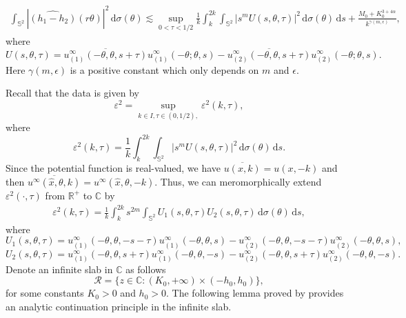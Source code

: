 \documentclass[reqno, 12pt]{amsart}
\numberwithin{equation}{section}
\begin{document}
	\begin{align} \label{5.9}
		\int_{\mathbb S^2}|\widehat{(h_1-h_2)}(r\theta)|^2\,\mathrm{d}\sigma(\theta)\lesssim \sup_{0<\tau<1/2}\frac{1}{k}\int_k^{2k}\int_{\mathbb S^2}|s^mU(s,\theta,\tau)|^2\,\mathrm{d}\sigma(\theta)\,\mathrm{d}s
		+ \frac{M_0+K_0^{3+4\alpha}}{k^{\gamma(m,\epsilon)}},
	\end{align} where
	\[U(s,\theta,\tau)=\overline{u_{(1)}^\infty(-\theta, \theta,s+\tau)} {u_{(1)}^\infty(-\theta;\theta,  s)}-\overline{u_{(2)}^\infty(-\theta, \theta,s+\tau)} {u_{(2)}^\infty(-\theta;\theta,  s)}.\] 
	Here $\gamma(m,\epsilon)$ is a positive constant which only depends on $m$ and $\epsilon.$
	
	Recall that the data is given by
	\[
	\varepsilon^2 =  \sup_{k\in I, \tau\in(0, 1/2), } \varepsilon^2(k, \tau),
	\]
	where
	\[
	\varepsilon^2(k, \tau)=\frac{1}{k}\int_k^{2k}\int_{\mathbb S^2}|s^{m}U(s,\theta,\tau)|^2\,\mathrm{d}\sigma(\theta)\,\mathrm{d}s.
	\] Since the potential function is real-valued, we have $\overline{u(x, k)} = u(x,-k)$ and then $\overline{u^\infty(\hat x, \theta, k)} = u^\infty(\hat x, \theta, -k)$.
	Thus, we can meromorphically extend $\varepsilon^2(\cdot,\tau)$ from $\mathbb R^+$ to $\mathbb C $ by \begin{align*}
		\varepsilon^2(k, \tau)  =\frac{1}{k}\int_k^{2k} s^{2m}\int_{\mathbb S^2}U_1(s,\theta,\tau)U_2(s,\theta,\tau)\,\mathrm{d}\sigma(\theta)\,\mathrm{d}s,
	\end{align*} where \[
	U_1(s,\theta,\tau)=u_{(1)}^\infty(-\theta, \theta,-s-\tau) {u_{(1)}^\infty(-\theta,\theta,  s)}-u_{(2)}^\infty(-\theta, \theta,-s-\tau) {u_{(2)}^\infty(-\theta,\theta,  s)},
	\]\[U_2(s,\theta,\tau)=u_{(1)}^\infty(-\theta, \theta,s+\tau) {u_{(1)}^\infty(-\theta,\theta,  -s)}-u_{(2)}^\infty(-\theta, \theta,s+\tau) {u_{(2)}^\infty(-\theta,\theta,  -s)}.\] 
    Denote an infinite slab in $\mathbb C$ as follows
\begin{equation}\label{regionR}
	\mathcal{R} = \{z\in \mathbb C: (K_0, +\infty)\times (-h_0, h_0) \},
\end{equation}
for some constants $K_0>0$ and $h_0>0$.
The following lemma proved by \cite{LZZ} provides an analytic continuation principle in the infinite slab.
\end{document}

